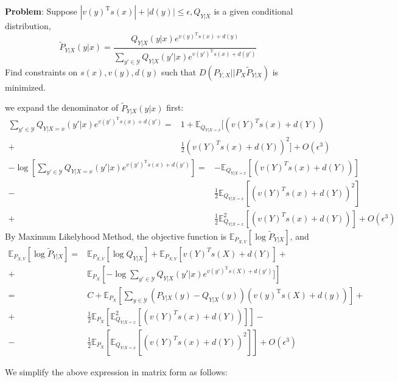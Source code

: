 \documentclass{article}
\def\T{\mathrm{T}}
\def\E{\mathbb{E}}
\begin{document}
\textbf{Problem}: Suppose $|v(y)^\T s(x)|+|d(y)|\leq \epsilon,Q_{Y|X}$ is a given conditional distribution,$$\tilde{P}_{Y|X}(y|x)=\frac{Q_{Y|X}(y|x) e^{v(y)^\T s(x)+d(y)}}{\sum_{y'\in \mathcal{Y}} Q_{Y|X}(y'|x) e^{v(y')^\T s(x)+d(y')}}$$
Find constraints on $s(x),v(y),d(y)$ such that $D(P_{Y,X}||P_X \tilde{P}_{Y|X})$ is minimized.

we expand the denominator of $\tilde{P}_{Y|X}(y|x)$ first:
\begin{align*}
\sum_{y'\in \mathcal{Y}} Q_{Y|X=x}(y'|x) e^{v(y')^\T s(x)+d(y')}=&
1+\E_{Q_{Y|X=x}}[(v(Y)^T s(x)+d(Y))\\
+&\frac{1}{2}(v(Y)^T s(x)+d(Y))^2]+O(\epsilon^3)
\end{align*}
\begin{align*}
-\log\left[\sum_{y'\in \mathcal{Y}} Q_{Y|X=x}(y'|x) e^{v(y')^\T s(x)+d(y')}\right]=&
-\E_{Q_{Y|X=x}}[(v(Y)^T s(x)+d(Y))] \\
-&\frac{1}{2}\E_{Q_{Y|X=x}}[(v(Y)^T s(x)+d(Y))^2]\\
+&\frac{1}{2}  \E^2_{Q_{Y|X=x}}[(v(Y)^T s(x)+d(Y))]+O(\epsilon^3)
\end{align*}
By Maximum Likelyhood Method, the objective function is $\E_{P_{X,Y}}[\log \tilde{P}_{Y|X}]$, and 
\begin{align*}
\E_{P_{X,Y}}[\log \tilde{P}_{Y|X}]=&\E_{P_{X,Y}}[\log Q_{Y|X}]+ \E_{P_{X,Y}}[v(Y)^T s(X)+d(Y)]+\\%
+&\E_{P_X}\left[-\log\sum_{y'\in \mathcal{Y}} Q_{Y|X}(y'|x) e^{v(y')^\T s(X)+d(y')}]\right]\\
=& C +  \E_{P_X}\left[\sum_{y\in \mathcal{Y}}(P_{Y|X}(y)-Q_{Y|X}(y))(v(y)^\T s(X)+d(y))\right]+\\
+&\frac{1}{2}\E_{P_X}\left[\E^2_{Q_{Y|X=x}}[(v(Y)^T s(x)+d(Y))]\right]-\\
-&\frac{1}{2}\E_{P_X}\left[\E_{Q_{Y|X=x}}[(v(Y)^T s(x)+d(Y))^2]\right]+ O(\epsilon^3)
\end{align*}

We simplify the above expression in matrix form as follows:
\end{document}
